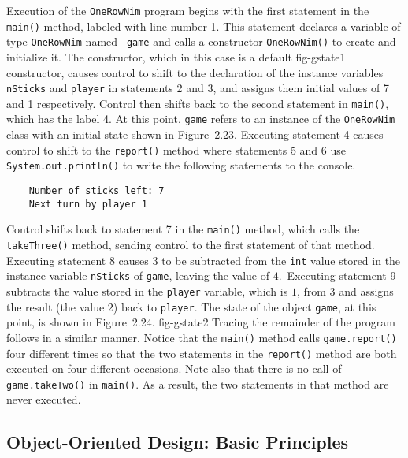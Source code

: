 Execution of the {\tt OneRowNim} program begins with the first
statement in the {\tt main()} method, labeled with line number 1.
This statement declares a variable of type {\tt OneRowNim} named {\tt
game} and calls a constructor {\tt OneRowNim()} to create and
initialize it.  The constructor, which in this case is a default
{fig-gstate1}
constructor, causes control to shift to the declaration of the
instance variables {\tt nSticks} and {\tt player} in statements 2 and
3, and assigns them initial values of 7 and 1 respectively.  Control
then shifts back to the second statement in {\tt main()}, which has
the label 4.  At this point, {\tt game} refers to an instance of the
{\tt OneRowNim} class with an initial state shown in
Figure~2.23.  Executing statement 4 causes control to
shift to the {\tt report()} method where statements 5 and 6 use {\tt
System.out.println()} to write the following statements to the
console.

\begin{jjjlisting}
\begin{lstlisting}
    Number of sticks left: 7
    Next turn by player 1
\end{lstlisting}
\end{jjjlisting}

\noindent Control shifts back to statement 7 in the {\tt main()} method, 
which calls the {\tt takeThree()} method, sending control to the first
statement of that method.  Executing statement 8 causes $3$ to be
subtracted from the {\tt int} value stored in the instance variable
{\tt nSticks} of {\tt game}, leaving the value of $4$.\ Executing
statement 9 subtracts the value stored in the {\tt player} variable,
which is $1$, from $3$ and assigns the result (the value $2$) back to
{\tt player}.  The state of the object {\tt game}, at this point, is
shown in Figure~2.24.
{fig-gstate2}
Tracing the remainder of the program follows in a similar manner.
Notice that the {\tt main()} method calls {\tt game.report()} four
different times so that the two statements in the {\tt report()}
method are both executed on four different occasions.  Note also that
there is no call of {\tt game.takeTwo()} in {\tt main()}. As a result,
the two statements in that method are never executed.

\subsection{Object-Oriented Design: Basic Principles}

